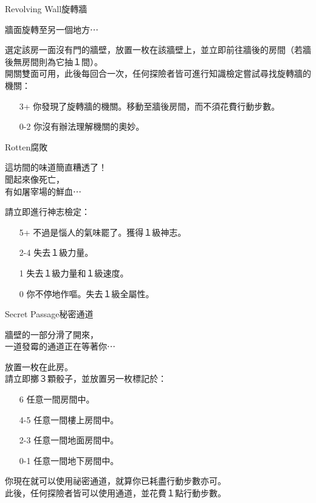 %
\begin{EventCard}{Revolving Wall}{旋轉牆}

  \begin{CardStory}
    牆面旋轉至另一個地方⋯
  \end{CardStory}

  選定該房一面沒有門的牆壁，放置一枚在該牆壁上，並立即前往牆後的房間（若牆後無房間則為它抽１間）。\\[0.5em]
  開關雙面可用，此後每回合一次，任何探險者皆可進行知識檢定嘗試尋找旋轉牆的機關：
  \begin{itemize}
    \item[3+] 你發現了旋轉牆的機關。移動至牆後房間，而不須花費行動步數。
    \item[0-2] 你沒有辦法理解機關的奧妙。
  \end{itemize}

\end{EventCard}%
%
\begin{EventCard}{Rotten}{腐敗}

  \begin{CardStory}
    這坊間的味道簡直糟透了！\\
    聞起來像死亡，\\
    有如屠宰場的鮮血⋯
  \end{CardStory}

  請立即進行神志檢定：
  \begin{itemize}
    \item[5+] 不過是惱人的氣味罷了。獲得１級神志。
    \item[2-4] 失去１級力量。
    \item[1] 失去１級力量和１級速度。
    \item[0] 你不停地作嘔。失去１級全屬性。
  \end{itemize}

\end{EventCard}%
%
\begin{EventCard}{Secret Passage}{秘密通道}

  \begin{CardStory}
    牆壁的一部分滑了開來，\\
    一道發霉的通道正在等著你⋯
  \end{CardStory}

  放置一枚在此房。\\[0.5em]
  請立即擲３顆骰子，並放置另一枚標記於：
  \begin{itemize}
    \item[6] 任意一間房間中。
    \item[4-5] 任意一間樓上房間中。
    \item[2-3] 任意一間地面房間中。
    \item[0-1] 任意一間地下房間中。
  \end{itemize}
  你現在就可以使用祕密通道，就算你已耗盡行動步數亦可。\\[0.5em]
  此後，任何探險者皆可以使用通道，並花費１點行動步數。\\[0.5em]

\end{EventCard}%
